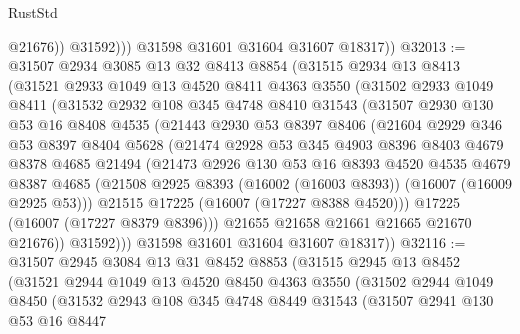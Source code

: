 \begin{lexlean}{RustStd}
\begin{coremodule}
                  @21676))
              @31592)))
        @31598
        @31601
        @31604
        @31607
        @18317))
@32013 := @31507
    @2934
    @3085
    @13
    @32
    @8413
    @8854
    (@31515
      @2934
      @13
      @8413
      (@31521
        @2933
        @1049
        @13
        @4520
        @8411
        @4363
        @3550
        (@31502
          @2933
          @1049
          @8411
          (@31532
            @2932
            @108
            @345
            @4748
            @8410
            @31543
            (@31507
              @2930
              @130
              @53
              @16
              @8408
              @4535
              (@21443
                @2930
                @53
                @8397
                @8406
                (@21604
                  @2929
                  @346
                  @53
                  @8397
                  @8404
                  @5628
                  (@21474
                    @2928
                    @53
                    @345
                    @4903
                    @8396
                    @8403
                    @4679
                    @8378
                    @4685
                    @21494
                    (@21473
                      @2926
                      @130
                      @53
                      @16
                      @8393
                      @4520
                      @4535
                      @4679
                      @8387
                      @4685
                      (@21508 @2925 @8393 (@16002 (@16003 @8393)) (@16007 (@16009 @2925 @53)))
                      @21515
                      @17225
                      (@16007 (@17227 @8388 @4520)))
                    @17225
                    (@16007 (@17227 @8379 @8396)))
                  @21655
                  @21658
                  @21661
                  @21665
                  @21670
                  @21676))
              @31592)))
        @31598
        @31601
        @31604
        @31607
        @18317))
@32116 := @31507
    @2945
    @3084
    @13
    @31
    @8452
    @8853
    (@31515
      @2945
      @13
      @8452
      (@31521
        @2944
        @1049
        @13
        @4520
        @8450
        @4363
        @3550
        (@31502
          @2944
          @1049
          @8450
          (@31532
            @2943
            @108
            @345
            @4748
            @8449
            @31543
            (@31507
              @2941
              @130
              @53
              @16
              @8447

\end{coremodule}
\end{lexlean}
